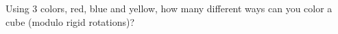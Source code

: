 Using $3$ colors, red, blue and yellow, how many different ways can you color a cube (modulo rigid rotations)?